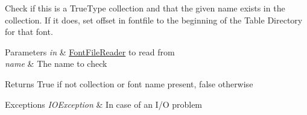 Check if this is a True\+Type collection and that the given name exists in the collection. If it does, set offset in fontfile to the beginning of the Table Directory for that font. 
\begin{DoxyParams}{Parameters}
{\em in} & \mbox{\hyperlink{classorg_1_1newdawn_1_1slick_1_1tools_1_1hiero_1_1truetype_1_1_font_file_reader}{Font\+File\+Reader}} to read from \\
\hline
{\em name} & The name to check \\
\hline
\end{DoxyParams}
\begin{DoxyReturn}{Returns}
True if not collection or font name present, false otherwise 
\end{DoxyReturn}

\begin{DoxyExceptions}{Exceptions}
{\em I\+O\+Exception} & In case of an I/O problem \\
\hline
\end{DoxyExceptions}

